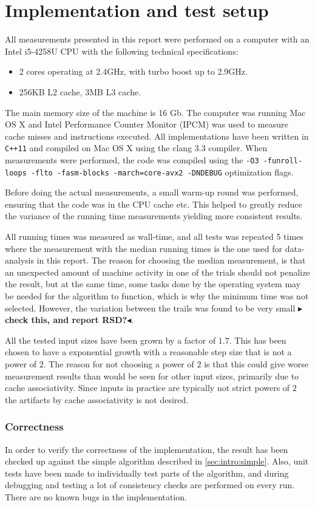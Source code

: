 \documentclass[twoside,11pt,openright]{report}
\newcommand{\todo}[1]{{\color[rgb]{.5,0,0}\textbf{$\blacktriangleright$#1$\blacktriangleleft$}}}
\begin{document}
\section{Implementation and test setup}
All measurements presented in this report were performed on a computer with an Intel i5-4258U CPU with the following technical specifications:
\begin{itemize}
  \item 2 cores operating at 2.4GHz, with turbo boost up to 2.9GHz.
  \item 256KB L2 cache, 3MB L3 cache.
\end{itemize}
The main memory size of the machine is 16 Gb. The computer was running Mac OS X and Intel Performance Counter Monitor (IPCM) was used to measure cache misses and instructions executed. All implementations have been written in \texttt{C++11} and compiled on  Mac OS X using the clang 3.3 compiler. When measurements were performed, the code was compiled using the \texttt{-O3 -funroll-loops -flto -fasm-blocks -march=core-avx2 -DNDEBUG} optimization flags.

Before doing the actual measurements, a small warm-up round was performed, ensuring that the code was in the CPU cache etc. This helped to greatly reduce the variance of the running time measurements yielding more consistent results.

All running times was measured as wall-time, and all tests was repeated 5 times where the measurement with the median running times is the one used for data-analysis in this report. The reason for choosing the median measurement, is that an unexpected amount of machine activity in one of the trials should not penalize the result, but at the same time, some tasks done by the operating system may be needed for the algorithm to function, which is why the minimum time was not selected. However, the variation between the trails was found to be very small \todo{check this, and report RSD?}.

All the tested input sizes have been grown by a factor of $1.7$. This has been chosen to have a exponential growth with a reasonable step size that is not a power of $2$. The reason for not choosing a power of $2$ is that this could give worse measurement results than would be seen for other input sizes, primarily due to cache associativity. Since inputs in practice are typically not strict powers of $2$ the artifacts by cache associativity is not desired.

\subsubsection{Correctness}
In order to verify the correctness of the implementation, the result has been checked up against the simple algorithm described in \cref{sec:intro:simple}. Also, unit tests have been made to individually test parts of the algorithm, and during debugging and testing a lot of consistency checks are performed on every run. There are no known bugs in the implementation. 
\end{document}

